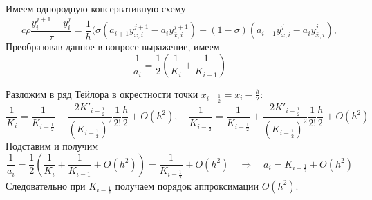 \documentclass[12pt, a4paper]{article}
\begin{document}

	
	Имеем однородную консервативную схему 
	\begin{equation*}
		c \rho \frac{y^{j+1}_i - y^{j}_i}{\tau} = \frac{1}{h} (\sigma(a_{i+1} y^{j+1}_{x,i} - a_{i} y^{j+1}_{\bar{x},i}) + (1-\sigma)(a_{i+1} y^{j}_{x,i} - a_{i} y^{j}_{\bar{x},i}),
	\end{equation*}
	Преобразовав данное в вопросе выражение, имеем
	\begin{equation*}
		\frac{1}{a_i} = \frac{1}{2} \left( \frac{1}{K_i} + \frac{1}{K_{i-1}} \right)
	\end{equation*}
	
	
	Разложим в ряд Тейлора в окрестности точки $x_{i-\frac{1}{2}} = x_i - \frac{h}{2}$:
	\begin{equation*}
		\frac{1}{K_i} = \frac{1}{K_{i-\frac{1}{2}}} - \frac{2 K'_{i-\frac{1}{2}}}{(K_{i-\frac{1}{2}})^2} \frac{1}{2!} \frac{h}{2} + O(h^2), \quad
		\frac{1}{K_{i-\frac{1}{2}}} = \frac{1}{K_{i-\frac{1}{2}}} + \frac{2 K'_{i-\frac{1}{2}}}{(K_{i-\frac{1}{2}})^2} \frac{1}{2!} \frac{h}{2} + O(h^2)
	\end{equation*}
	Подставим и получим
	\begin{equation*}
	\frac{1}{a_i} = \frac{1}{2} \left( \frac{1}{K_i} + \frac{1}{K_{i-1} } + O(h^2)\right) = \frac{1}{K_{i-\frac{1}{2}}} + O(h^2)  \quad \Rightarrow \quad a_i = K_{i-\frac{1}{2}} + O(h^2)
	\end{equation*}
	Следовательно при $K_{i-\frac{1}{2}}$ получаем порядок аппроксимации $O(h^2)$.
	
\end{document}

